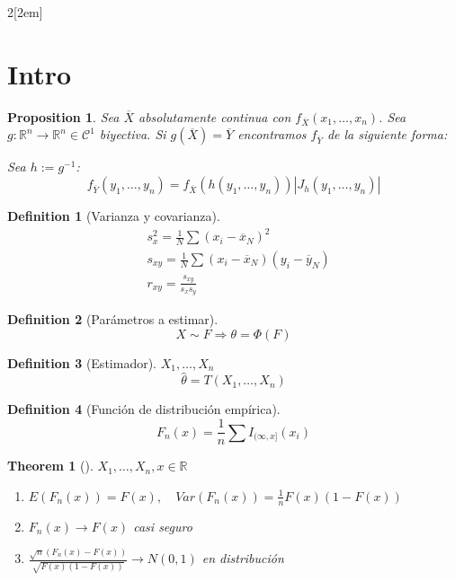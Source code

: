 \documentclass[leqno]{article}
\newtheorem*{theorem}{Theorem}
\newtheorem*{proposition}{Proposition}
\newtheorem*{definition}{Definition}
\begin{document}
\begin{multicols}{2}[\columnsep2em]

\section{Intro}

 \begin{proposition}
Sea $\overline{X}$ absolutamente continua con $f_{\overline{X}}(x_1,\ldots,x_n)$. Sea $g:\mathbb{R}^n\to \mathbb{R}^n \in \mathcal{C}^1$ biyectiva. Si  $g(\overline{X})=\overline{Y}$ encontramos $f_{\overline{Y}}$ de la siguiente forma:

Sea $h:=g^{-1}$:
\[
f_{\overline{Y}}(y_1, \ldots, y_n) = f_{\overline{X}}(h(y_1,\ldots,y_n))|J_h(y_1,\ldots,y_n)|
\] 
\end{proposition}

\begin{definition}[Varianza y covarianza]
  \begin{align*}
&s_x^2 = \frac{1}{N}\sum (x_i-\overline{x}_N)^2\\
&s_{xy}=\frac{1}{N}\sum(x_i-\overline{x}_N)(y_i-\overline{y}_N) \\
&r_{xy} = \frac{s_{xy}}{s_xs_y}
  \end{align*}
\end{definition}

\begin{definition}[Parámetros a estimar]
\[
X \sim F \Rightarrow \theta = \Phi(F)
\] 
\end{definition}

\begin{definition}[Estimador] $X_1, \ldots, X_n$
\[
\hat{\theta } = T(X_1, \ldots, X_n)
\] 
\end{definition}

\begin{definition}[Función de distribución empírica]
  \[
	F_n(x) = \frac{1}{n}\sum I_{(\infty, x]}(x_i)
  \] 
\end{definition}

\begin{theorem}[]$X_1, \ldots, X_n, x \in \mathbb{R}$
  \begin{enumerate}[topsep=-6pt, itemsep=0pt]
	\item $E(F_n(x))=F(x), \quad Var(F_n(x))= \frac{1}{n}F(x)(1-F(x))$
	\item $F_n(x) \to  F(x)$ casi seguro
	\item $\frac{\sqrt{n} (F_n(x)-F(x))}{\sqrt{F(x)(1-F(x))} } \to  N(0,1)$ en distribución
  \end{enumerate}
\end{theorem}


\end{multicols}
\end{document}
